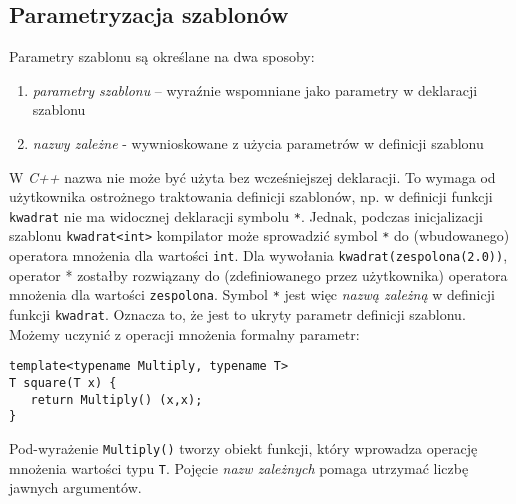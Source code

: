 \documentclass[11pt, a4paper]{article}
\begin{document}
\lstset{language=C++}

\subsection{Parametryzacja szablonów}

Parametry szablonu są określane na dwa sposoby:

\begin{enumerate}

\item \emph{parametry szablonu} – wyraźnie wspomniane jako parametry w deklaracji szablonu

\item \emph{nazwy zależne} - wywnioskowane z użycia parametrów w definicji szablonu

\end{enumerate}

W \emph{C++} nazwa nie może być użyta bez wcześniejszej deklaracji. To wymaga od użytkownika ostrożnego traktowania definicji szablonów, np. w definicji funkcji \verb#kwadrat# nie ma widocznej deklaracji symbolu \verb#*#. Jednak, podczas inicjalizacji szablonu \verb#kwadrat<int># kompilator może sprowadzić symbol \verb#*# do (wbudowanego) operatora mnożenia dla wartości \verb#int#. Dla wywołania \verb#kwadrat(zespolona(2.0))#, operator * zostałby rozwiązany do (zdefiniowanego przez użytkownika) operatora mnożenia dla wartości \verb#zespolona#. Symbol \verb#*# jest więc \emph{nazwą zależną} w definicji funkcji \verb#kwadrat#. Oznacza to, że jest to ukryty parametr definicji szablonu. Możemy uczynić z operacji mnożenia formalny parametr:

\begin{lstlisting}[frame=single]
template<typename Multiply, typename T>
T square(T x) {
   return Multiply() (x,x);
}
\end{lstlisting}

Pod-wyrażenie \verb#Multiply()# tworzy obiekt funkcji, który wprowadza operację mnożenia wartości typu \verb#T#. Pojęcie \emph{nazw zależnych} pomaga utrzymać liczbę jawnych argumentów.
\end{document}
